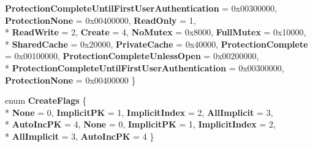 \begin{DoxyCompactItemize}
{\bfseries Protection\-Complete\-Until\-First\-User\-Authentication} = 0x00300000, 
{\bfseries Protection\-None} = 0x00400000, 
{\bfseries Read\-Only} = 1, 
\\*
{\bfseries Read\-Write} = 2, 
{\bfseries Create} = 4, 
{\bfseries No\-Mutex} = 0x8000, 
{\bfseries Full\-Mutex} = 0x10000, 
\\*
{\bfseries Shared\-Cache} = 0x20000, 
{\bfseries Private\-Cache} = 0x40000, 
{\bfseries Protection\-Complete} = 0x00100000, 
{\bfseries Protection\-Complete\-Unless\-Open} = 0x00200000, 
\\*
{\bfseries Protection\-Complete\-Until\-First\-User\-Authentication} = 0x00300000, 
{\bfseries Protection\-None} = 0x00400000
 \}
\item 
enum {\bfseries Create\-Flags} \{ \\*
{\bfseries None} = 0, 
{\bfseries Implicit\-P\-K} = 1, 
{\bfseries Implicit\-Index} = 2, 
{\bfseries All\-Implicit} = 3, 
\\*
{\bfseries Auto\-Inc\-P\-K} = 4, 
{\bfseries None} = 0, 
{\bfseries Implicit\-P\-K} = 1, 
{\bfseries Implicit\-Index} = 2, 
\\*
{\bfseries All\-Implicit} = 3, 
{\bfseries Auto\-Inc\-P\-K} = 4
 \}
\end{DoxyCompactItemize}
